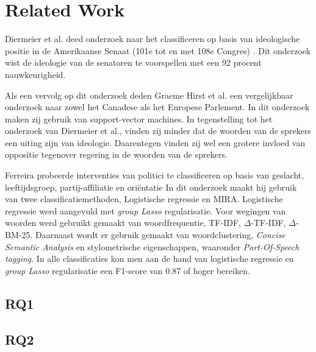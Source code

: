 \section{Related Work}
\label{sec:rel}

Diermeier et al. deed onderzoek naar het classificeren op basis van ideologische positie in de Amerikaanse Senaat (101e tot en met 108e Congres) \cite{diermeier_godbout_yu_kaufmann_2012}. Dit onderzoek wist de ideologie van de senatoren te voorspellen met een 92 procent nauwkeurigheid.\par
Als een vervolg op dit onderzoek deden Graeme Hirst et al. een vergelijkbaar onderzoek naar zowel het Canadese als het Europese Parlement\cite{Hirst_textto}. In dit onderzoek maken zij gebruik van support-vector machines. In tegenstelling tot het onderzoek van Diermeier et al., vinden zij minder dat de woorden van de sprekers een uiting zijn van ideologie. Daarentegen vinden zij wel een grotere invloed van oppositie tegenover regering in de woorden van de sprekers.\par
Ferreira probeerde interventies van politici te classificeren op basis van geslacht, leeftijdsgroep, partij-affiliatie en ori\"{e}ntatie\cite{Ferreira2016UsingTT} In dit onderzoek maakt hij gebruik van twee classificatiemethoden, Logistische regressie en MIRA. Logistische regressie werd aangevuld met \textit{group Lasso} regularisatie. Voor wegingen van woorden werd gebruikt gemaakt van woordfrequentie, TF-IDF, $\Delta$-TF-IDF, $\Delta$-BM-25. Daarnaast wordt er gebruik gemaakt van woordclustering, \textit{Concise Semantic Analysis} en stylometrische eigenschappen, waaronder \textit{Part-Of-Speech tagging}. In alle classificaties kon men aan de hand van logistische regressie en \textit{group Lasso} regularisatie een F1-score van 0.87 of hoger bereiken.\par


\subsection{RQ1}

\subsection{RQ2}
